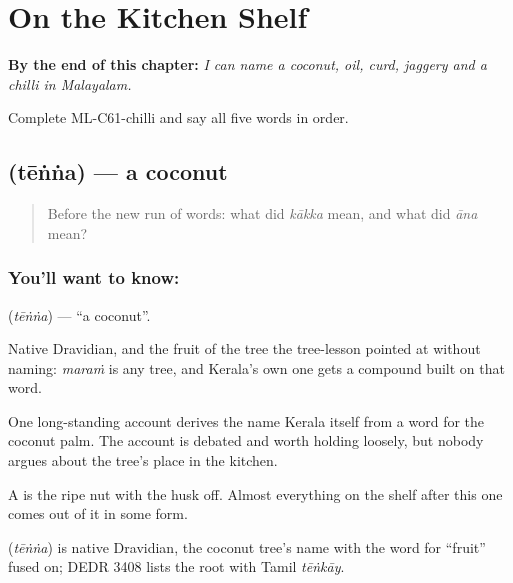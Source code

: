 
\chapter{On the Kitchen Shelf}
\label{ch:ml-on-the-kitchen-shelf}

\begin{chapteropening}
\textbf{By the end of this chapter:} \emph{I can name a coconut, oil, curd, jaggery and a chilli in Malayalam.}

Complete ML-C61-chilli and say all five words in order.
\end{chapteropening}

\section[\texorpdfstring{\ml{തേങ്ങ} (tēṅṅa)}{തേങ്ങ (tēṅṅa)}]{ (tēṅṅa) — a coconut}

\label{lesson:ML-C61-coconut}



\begin{quote}
Before the new run of words: what did \emph{kākka} mean, and what did \emph{āna} mean?
\end{quote}

\subsection*{You'll want to know: }
\textbf{} (\emph{tēṅṅa}) — \textquotedblleft{}a coconut\textquotedblright{}.

Native Dravidian, and the fruit of the tree the tree-lesson pointed at without naming: \emph{maraṁ} is any tree, and Kerala's own one gets a compound built on that word.

One long-standing account derives the name Kerala itself from a word for the coconut palm. The account is debated and worth holding loosely, but nobody argues about the tree's place in the kitchen.

A  is the ripe nut with the husk off. Almost everything on the shelf after this one comes out of it in some form.

\begin{cousinweb}
\textbf{} (\emph{tēṅṅa}) is native Dravidian, the coconut tree's name with the word for \textquotedblleft{}fruit\textquotedblright{} fused on; DEDR 3408 lists the root with Tamil \emph{tēṅkāy}.
\end{cousinweb}

